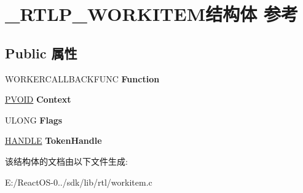 \hypertarget{struct___r_t_l_p___w_o_r_k_i_t_e_m}{}\section{\+\_\+\+R\+T\+L\+P\+\_\+\+W\+O\+R\+K\+I\+T\+E\+M结构体 参考}
\label{struct___r_t_l_p___w_o_r_k_i_t_e_m}
\subsection*{Public 属性}
\begin{DoxyCompactItemize}
\item 
\mbox{\label{struct___r_t_l_p___w_o_r_k_i_t_e_m_aaf7c9ddc95d5c6297a673e9ab545c3b2}} 
W\+O\+R\+K\+E\+R\+C\+A\+L\+L\+B\+A\+C\+K\+F\+U\+NC {\bfseries Function}
\item 
\mbox{\label{struct___r_t_l_p___w_o_r_k_i_t_e_m_ae490af69f561a8d34ed474c02fcf2ba1}} 
\hyperlink{interfacevoid}{P\+V\+O\+ID} {\bfseries Context}
\item 
\mbox{\label{struct___r_t_l_p___w_o_r_k_i_t_e_m_a1ae94a258f01b3150f969bdfcc1fa6ba}} 
U\+L\+O\+NG {\bfseries Flags}
\item 
\mbox{\label{struct___r_t_l_p___w_o_r_k_i_t_e_m_a460b317823f268f04c970175340a5669}} 
\hyperlink{interfacevoid}{H\+A\+N\+D\+LE} {\bfseries Token\+Handle}
\end{DoxyCompactItemize}


该结构体的文档由以下文件生成\+:\begin{DoxyCompactItemize}
\item 
E\+:/\+React\+O\+S-\/0../sdk/lib/rtl/workitem.\+c\end{DoxyCompactItemize}
